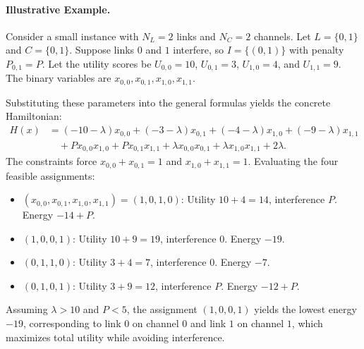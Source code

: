 \documentclass[12pt]{article}
\begin{document}
\paragraph{Illustrative Example.}
Consider a small instance with $N_L = 2$ links and $N_C = 2$ channels. Let $L = \{0, 1\}$ and $C = \{0, 1\}$. Suppose links $0$ and $1$ interfere, so $I = \{(0,1)\}$ with penalty $P_{0,1} = P$. Let the utility scores be $U_{0,0} = 10$, $U_{0,1} = 3$, $U_{1,0} = 4$, and $U_{1,1} = 9$. The binary variables are $x_{0,0}, x_{0,1}, x_{1,0}, x_{1,1}$.

Substituting these parameters into the general formulas yields the concrete Hamiltonian:
\begin{align}
H(x) &= (-10-\lambda)x_{0,0} + (-3-\lambda)x_{0,1} + (-4-\lambda)x_{1,0} + (-9-\lambda)x_{1,1} \\
&\quad + P x_{0,0} x_{1,0} + P x_{0,1} x_{1,1} + \lambda x_{0,0} x_{0,1} + \lambda x_{1,0} x_{1,1} + 2\lambda.
\end{align}
The constraints force $x_{0,0} + x_{0,1} = 1$ and $x_{1,0} + x_{1,1} = 1$. Evaluating the four feasible assignments:
\begin{itemize}
    \item $(x_{0,0}, x_{0,1}, x_{1,0}, x_{1,1}) = (1,0,1,0)$: Utility $10+4=14$, interference $P$. Energy $-14 + P$.
    \item $(1,0,0,1)$: Utility $10+9=19$, interference $0$. Energy $-19$.
    \item $(0,1,1,0)$: Utility $3+4=7$, interference $0$. Energy $-7$.
    \item $(0,1,0,1)$: Utility $3+9=12$, interference $P$. Energy $-12 + P$.
\end{itemize}
Assuming $\lambda > 10$ and $P < 5$, the assignment $(1,0,0,1)$ yields the lowest energy $-19$, corresponding to link $0$ on channel $0$ and link $1$ on channel $1$, which maximizes total utility while avoiding interference.
\end{document}
